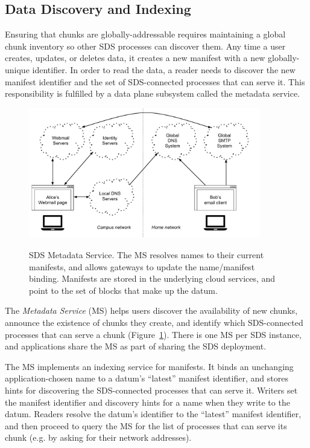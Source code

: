 \subsection{Data Discovery and Indexing}

Ensuring that chunks are globally-addressable requires maintaining a global
chunk inventory so other SDS processes can discover them.  Any time a user creates,
updates, or deletes data, it creates a new manifest
with a new globally-unique identifier.  In order to read the data, a reader
needs to discover the new manifest identifier and the set of SDS-connected
processes that can serve it.  This responsibility is fulfilled by a data plane
subsystem called the metadata service.

\begin{figure}[h]
   \caption{SDS Metadata Service.  The MS resolves names to their current
   manifests, and allows gateways to update the name/manifest binding.
   Manifests are stored in the underlying cloud services, and
   point to the set of blocks that make up the datum.}
   \centering
   \includegraphics[width=0.9\textwidth,page=5]{figures/dissertation-figures}
   \label{fig:chap2-metadata-service}
\end{figure}

The \emph{Metadata Service} (MS) helps users discover the
availability of new chunks, announce the existence of chunks they create, and
identify which SDS-connected processes that can serve a chunk
(Figure~\ref{fig:chap2-metadata-service}).
There is one MS per SDS instance, and
applications share the MS as part of sharing the SDS deployment.

The MS implements an indexing service for manifests.  It binds an unchanging
application-chosen name to a datum's ``latest'' manifest
identifier, and stores hints for discovering the SDS-connected processes that can serve it.
Writers set the manifest identifier and discovery hints 
for a name when they write to the datum.
Readers resolve the datum's identifier to the ``latest'' manifest identifier,
and then proceed to query the MS for the list of processes that can serve its
chunk (e.g. by asking for their network addresses).

